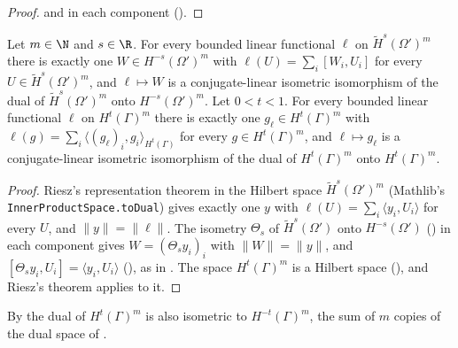 \begin{proof}
\leanok
{} and  in each component
().
\end{proof}

\begin{theorem}
\label{thm:vector-sobolev-duality}
\leanok
{}
Let $m \in \N$ and $s \in \R$. For every bounded linear functional $\ell$ on
$\tilde H^s(\Omega')^m$ there is exactly one $W \in H^{-s}(\Omega')^m$ with
$\ell(U) = \sum_i [W_i, U_i]$ for every $U \in \tilde H^s(\Omega')^m$, and $\ell \mapsto W$ is a
conjugate-linear isometric isomorphism of the dual of $\tilde H^s(\Omega')^m$ onto
$H^{-s}(\Omega')^m$. Let $0 < t < 1$. For every bounded linear functional $\ell$ on
$H^t(\Gamma)^m$ there is exactly one $g_\ell \in H^t(\Gamma)^m$ with
$\ell(g) = \sum_i \langle (g_\ell)_i, g_i \rangle_{H^t(\Gamma)}$ for every $g \in H^t(\Gamma)^m$,
and $\ell \mapsto g_\ell$ is a conjugate-linear isometric isomorphism of the dual of
$H^t(\Gamma)^m$ onto $H^t(\Gamma)^m$.
\end{theorem}

\begin{proof}
\leanok
Riesz's representation theorem in the Hilbert space $\tilde H^s(\Omega')^m$ (Mathlib's
\texttt{InnerProductSpace.\allowbreak toDual}) gives exactly one $y$ with
$\ell(U) = \sum_i \langle y_i, U_i \rangle$ for every $U$, and $\|y\| = \|\ell\|$. The isometry
$\Theta_s$ of $\tilde H^s(\Omega')$ onto $H^{-s}(\Omega')$ () in
each component gives $W = (\Theta_s y_i)_i$ with $\|W\| = \|y\|$, and
$[\Theta_s y_i, U_i] = \langle y_i, U_i \rangle$ (), as in
. The space $H^t(\Gamma)^m$ is a Hilbert space
(), and Riesz's theorem applies to it.
\end{proof}

By  the dual of $H^t(\Gamma)^m$ is also isometric to
$H^{-t}(\Gamma)^m$, the sum of $m$ copies of the dual space of .
